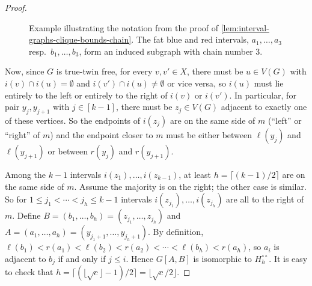 \documentclass{theoretics}
\newcommand{\chainNum}{chain number\xspace}
\begin{document}
\begin{proof}
	\begin{figure}[tbhp]
		\centering
		\caption{%
			Example illustrating the notation from the proof of \cref{lem:interval-graphs-clique-bounds-chain}.
			The fat blue and red intervals, $a_1,\ldots,a_3$ resp.\ $b_1,\ldots,b_3$,
			form an induced subgraph with \chainNum 3.
		}
		\label{fig:interval-graphs-clique-bounds-chain}
	\end{figure}
	
	
	Now, since $G$ is true-twin free, for every $v,v'\in X$, there must be $u\in V(G)$ with
	$i(v)\cap i(u)=\emptyset$ and $i(v')\cap i(u)\ne \emptyset$ or vice versa, so
	$i(u)$ must lie entirely to the left or entirely to the right of $i(v)$ or $i(v')$.
	In particular, for pair $y_j,y_{j+1}$ with $j\in[k-1]$, there must be $z_j\in V(G)$
	adjacent to exactly one of these vertices. 
	So the endpoints of $i(z_j)$ are on the same side of $m$ (``left'' or ``right'' of $m$)
	and the endpoint closer to $m$ must be
	either between $\ell(y_j)$ and $\ell(y_{j+1})$
	or between $r(y_j)$ and $r(y_{j+1})$.
	
	
	Among the $k-1$ intervals $i(z_1),\ldots,i(z_{k-1})$, at least $h=\lceil(k-1)/2\rceil$
	are on the same side of $m$.
	Assume the majority is on the right; the other case is similar.
	So for $1\le j_1<\cdots<j_h \le k-1$ intervals $i(z_{j_1}),\ldots,i(z_{j_h})$ are all to the right of $m$.
	Define $B=(b_1,\ldots,b_h) = (z_{j_1},\ldots,z_{j_h})$
	and $A = (a_1,\ldots,a_h) = (y_{j_1+1},\ldots,y_{j_h+1})$.
	By definition, 
	$\ell(b_1)<r(a_1)<\ell(b_2)<r(a_2)<\cdots<\ell(b_h)<r(a_h)$,
	so $a_i$ is adjacent to $b_j$ if and only if $j \le i$.
	Hence $G[A,B]$ is isomorphic to $H^{\circ\circ}_h$.
	It is easy to check that 
	$h = \lceil (\lfloor\sqrt c\rfloor-1)/2\rceil = \lfloor \sqrt c/2\rfloor$.
\end{proof}
\end{document}
